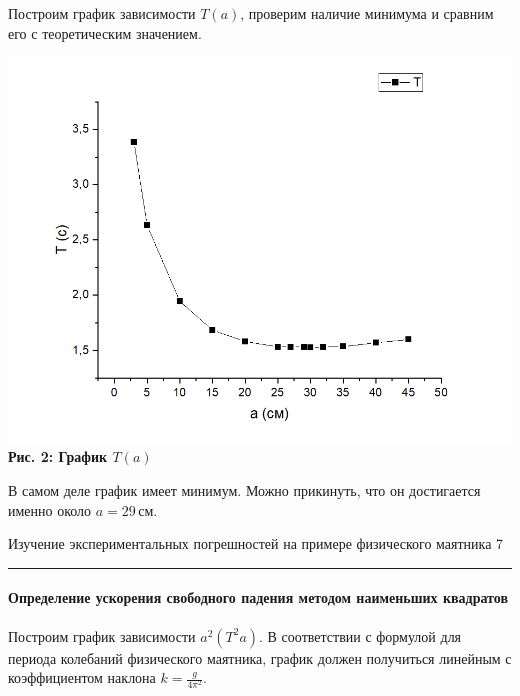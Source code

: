 \documentclass[12pt,a4paper]{scrartcl}
\begin{document}
	\par Построим график зависимости $T(a)$, проверим наличие минимума и сравним его с теоретическим значением.
	
	\begin{center}
		\includegraphics[scale=1.1]{PIC_2.png}
		\\\textbf{Рис. 2: График $T(a)$}
	\end{center}

	\par В самом деле график имеет минимум. Можно прикинуть, что он достигается именно около $a = 29\,$см.
	
	\newpage
	
	
	
	
	\begin{flushleft}
		
		\footnotesize{Изучение экспериментальных погрешностей на примере физического маятника} \hspace{\fill} \footnotesize{7}
		\\[-0.3cm]\noindent\rule{\textwidth}{0.3pt}
		
	\end{flushleft}
	
	\paragraph{Определение ускорения свободного падения методом наименьших квадратов} \hfill
	
	\par Построим график зависимости $a^2(T^2a)$. В соответствии с формулой для периода колебаний физического маятника, график должен получиться линейным с коэффициентом наклона $k = \frac{g}{4\pi^2}$.
	
\end{document}
